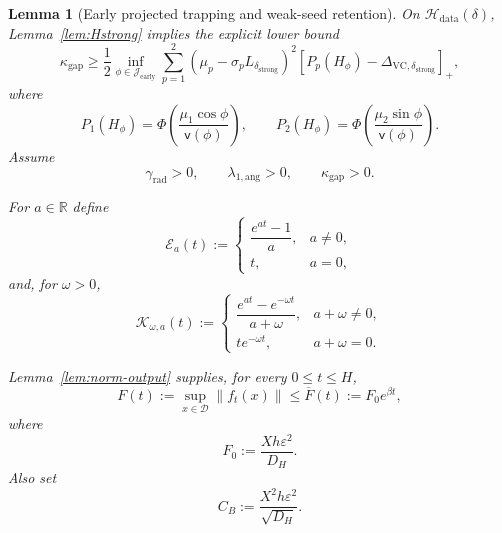 \documentclass{article} %
\theoremstyle{plain}
\newtheorem{lemma}[theorem]{Lemma}
\theoremstyle{definition}
\theoremstyle{remark}
\begin{document}
\begin{lemma}[Early projected trapping and weak-seed retention]
On $\mathcal H_{\mathrm{data}}(\delta)$, Lemma~\ref{lem:Hstrong} implies the
explicit lower bound
\[
\boxed{
\kappa_{\mathrm{gap}}
\ge
\frac12
\inf_{\phi\in\mathcal J_{\mathrm{early}}}
\sum_{p=1}^2
\left(
\mu_p-\sigma_pL_{\delta_{\mathrm{strong}}}
\right)^2
\left[
P_p(H_\phi)
-
\Delta_{\mathrm{VC},\delta_{\mathrm{strong}}}
\right]_+,
}
\]
where
\[
P_1(H_\phi)
=
\Phi\!\left(
\frac{\mu_1\cos\phi}{\mathsf v(\phi)}
\right),
\qquad
P_2(H_\phi)
=
\Phi\!\left(
\frac{\mu_2\sin\phi}{\mathsf v(\phi)}
\right).
\]
Assume
\[
\boxed{
\gamma_{\mathrm{rad}}>0,
\qquad
\lambda_{1,\mathrm{ang}}>0,
\qquad
\kappa_{\mathrm{gap}}>0.
}
\]

For $a\in\mathbb R$ define
\[
\mathcal E_a(t)
:=
\begin{cases}
\dfrac{e^{at}-1}{a},&a\neq0,\\[2mm]
t,&a=0,
\end{cases}
\]
and, for $\omega>0$,
\[
\mathcal K_{\omega,a}(t)
:=
\begin{cases}
\dfrac{e^{at}-e^{-\omega t}}{a+\omega},&a+\omega\neq0,\\[2mm]
t e^{-\omega t},&a+\omega=0.
\end{cases}
\]

Lemma~\ref{lem:norm-output} supplies, for every $0\le t\le H$,
\[
\boxed{
F(t)
:=
\sup_{x\in\mathcal D}\|f_t(x)\|
\le
\overline F(t)
:=
F_0e^{\beta t},
}
\]
where
\[
\boxed{
F_0
:=
\frac{Xh\varepsilon^2}{D_H}.
}
\]
Also set
\[
\boxed{
C_B
:=
\frac{X^2h\varepsilon^2}{\sqrt{D_H}}.
}
\]


\end{lemma}
\end{document}
